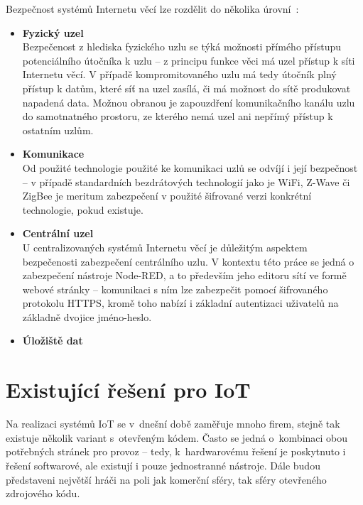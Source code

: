Bezpečnost systémů Internetu věcí lze rozdělit do několika úrovní~\cite{IoTSecurity}:
\begin{itemize}
    \item \textbf{Fyzický uzel} \\
    Bezpečenost z hlediska fyzického uzlu se týká možnosti přímého přístupu potenciálního útočníka k uzlu -- z
    principu funkce věci má uzel přístup k síti Internetu věcí.
    V případě kompromitovaného uzlu má tedy útočník plný přístup k datům, které síť na uzel zasílá, či má možnost do
    sítě produkovat napadená data.
    Možnou obranou je zapouzdření komunikačního kanálu uzlu do samotnatného prostoru, ze kterého nemá uzel ani nepřímý
    přístup k ostatním uzlům.

    \item \textbf{Komunikace} \\
    Od použité technologie použité ke komunikaci uzlů se odvíjí i její bezpečnost -- v případě standardních
    bezdrátových technologií jako je WiFi, Z-Wave či ZigBee je meritum zabezpečení v použité šifrované verzi
    konkrétní technologie, pokud existuje.

    \item \textbf{Centrální uzel} \\
    U centralizovaných systémů Internetu věcí je důležitým aspektem bezpečenosti zabezpečení centrálního uzlu.
    V kontextu této práce se jedná o zabezpečení nástroje Node-RED,  a to především jeho editoru
    sítí ve formě webové stránky -- komunikaci s ním lze zabezpečit pomocí šifrovaného protokolu HTTPS, kromě toho
    nabízí i základní autentizaci uživatelů na základně dvojice jméno-heslo.

    \item \textbf{Úložiště dat} \\
\end{itemize}


\section{Existující řešení pro IoT}\label{sec:existujici-reseni}

Na realizaci systémů IoT se v~dnešní době zaměřuje mnoho firem, stejně tak existuje několik variant s~otevřeným kódem.
Často se jedná o~kombinaci obou potřebných stránek pro provoz -- tedy, k~hardwarovému řešení je poskytnuto i řešení
softwarové, ale existují i pouze jednostranné nástroje.
Dále budou představeni největší hráči na poli jak komerční sféry, tak sféry otevřeného zdrojového kódu.

